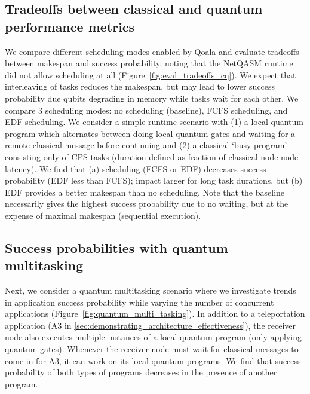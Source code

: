 \subsection{Tradeoffs between classical and quantum performance metrics}
\label{sec:effectiveness_of_task_splitting}
We compare different scheduling modes enabled by Qoala and evaluate tradeoffs between makespan and success probability, noting that the NetQASM runtime did not allow scheduling at all (Figure~\ref{fig:eval_tradeoffs_cq}).
We expect that interleaving of tasks reduces the makespan, but may lead to lower success probability due qubits degrading in memory while tasks wait for each other.
We compare 3 scheduling modes: no scheduling (baseline), FCFS scheduling, and EDF scheduling.
We consider a simple runtime scenario with 
(1) a local quantum program which alternates between doing local quantum gates and waiting for a remote classical message before continuing and 
(2) a classical `busy program' consisting only of CPS tasks (duration defined as fraction of classical node-node latency).
We find that
(a) scheduling (FCFS or EDF) decreases success probability (EDF less than FCFS); impact larger for long task durations, but
(b) EDF provides a better makespan than no scheduling.
Note that the baseline necessarily gives the highest success probability due to no waiting, but at the expense of maximal makespan (sequential execution).

\subsection{Success probabilities with quantum multitasking}
\label{sec:quantum_multitasking}
Next, we consider a quantum multitasking scenario where we investigate trends in application success probability while varying the number of concurrent applications (Figure~\ref{fig:quantum_multi_tasking}).
In addition to a teleportation application (A3 in \ref{sec:demonstrating_architecture_effectiveness}), the receiver node also executes multiple instances of a local quantum program (only applying quantum gates).
Whenever the receiver node must wait for classical messages to come in for A3, it can work on its local quantum programs.
We find that success probability of both types of programs decreases in the presence of another program.

